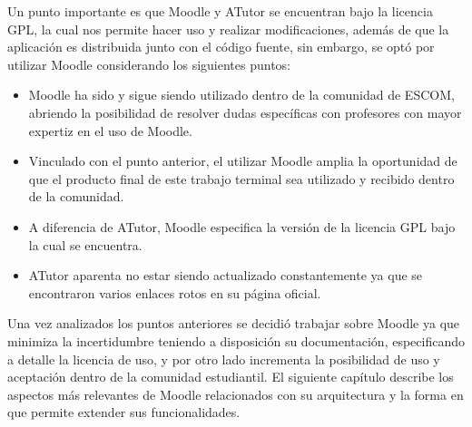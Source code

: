  \noindent Un punto importante es que Moodle y ATutor se encuentran bajo la licencia GPL,
 la cual nos permite hacer uso y realizar modificaciones, además de que la aplicación es
 distribuida junto con el código fuente, sin embargo, se optó por utilizar Moodle considerando
 los siguientes puntos:

    \begin{itemize}
        \item Moodle ha sido y sigue siendo utilizado dentro de la comunidad de ESCOM,
              abriendo la posibilidad de resolver dudas específicas con profesores con
              mayor expertiz en el uso de Moodle.

        \item Vinculado con el punto anterior, el utilizar Moodle amplia la oportunidad
              de que el producto final de este trabajo terminal sea utilizado y
              recibido dentro de la comunidad.

        \item A diferencia de ATutor, Moodle especifica la versión de la licencia GPL
              bajo la cual se encuentra.

        \item ATutor aparenta no estar siendo actualizado constantemente ya que se
              encontraron varios enlaces rotos en su página oficial.
    \end{itemize}

 \noindent Una vez analizados los puntos anteriores se decidió trabajar sobre Moodle
 ya que minimiza la incertidumbre teniendo a disposición su documentación,
 especificando a detalle la licencia de uso, y por otro lado incrementa la
 posibilidad de uso y aceptación dentro de la comunidad estudiantil. El siguiente
 capítulo describe los aspectos más relevantes de Moodle relacionados con su
 arquitectura y la forma en que permite extender sus funcionalidades.




